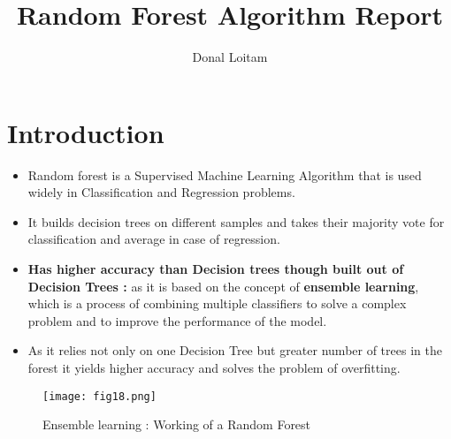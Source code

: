 \documentclass[a4paper, 11pt]{article}
\title{Random Forest Algorithm Report}
\author{Donal Loitam}
\begin{document}
\maketitle
\tableofcontents

\section{Introduction}
\begin{itemize}
    \item Random forest is a Supervised Machine Learning Algorithm that is used widely in Classification and Regression problems.
    \item  It builds decision trees on different samples and takes their majority vote for classification and average in case of regression.
    \item \textbf{Has higher accuracy than Decision trees though built out of Decision Trees :} as it is based on the concept of \textbf{ensemble learning}, 
    which is a process of combining multiple classifiers to solve a complex problem and to improve the performance of the model.
    \item As it relies not only on one Decision Tree but greater number of trees in the forest it yields higher accuracy and solves the problem of overfitting.
\end{itemize}
 \begin{figure}[ht!]
    \texttt{[image: fig18.png]}
    \label{fig:fig18}
    \caption{Ensemble learning : Working of a Random Forest}
  \end{figure}
\pagebreak
\end{document}

